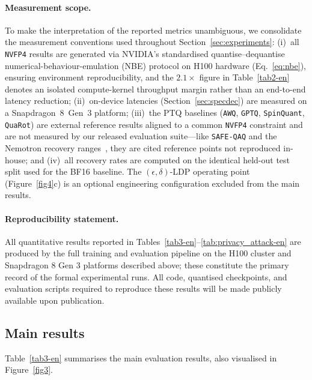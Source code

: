 \documentclass[a4paper,fleqn]{cas-sc}
\begin{document}
\paragraph{Measurement scope.} To make the interpretation of the reported metrics unambiguous, we consolidate the measurement conventions used throughout Section~\ref{sec:experiments}: (i)~all \texttt{NVFP4} results are generated via NVIDIA's standardised quantise--dequantise numerical-behaviour-emulation (NBE) protocol on H100 hardware (Eq.~\eqref{eq:nbe}), ensuring environment reproducibility, and the $2.1\times$ figure in Table~\ref{tab2-en} denotes an isolated compute-kernel throughput margin rather than an end-to-end latency reduction; (ii)~on-device latencies (Section~\ref{sec:specdec}) are measured on a Snapdragon~8~Gen~3 platform; (iii)~the PTQ baselines (\texttt{AWQ}, \texttt{GPTQ}, \texttt{SpinQuant}, \texttt{QuaRot}) are external reference results aligned to a common \texttt{NVFP4} constraint and are not measured by our released evaluation suite---like \texttt{SAFE-QAQ} and the Nemotron recovery ranges~\citep{3}, they are cited reference points not reproduced in-house; and (iv)~all recovery rates are computed on the identical held-out test split used for the BF16 baseline. The $(\epsilon,\delta)$-LDP operating point (Figure~\ref{fig4}c) is an optional engineering configuration excluded from the main results.

\paragraph{Reproducibility statement.} All quantitative results reported in Tables~\ref{tab3-en}--\ref{tab:privacy_attack-en} are produced by the full training and evaluation pipeline on the H100 cluster and Snapdragon 8 Gen 3 platforms described above; these constitute the primary record of the formal experimental runs. All code, quantised checkpoints, and evaluation scripts required to reproduce these results will be made publicly available upon publication.

\subsection{Main results}\label{sec:main-results}

Table~\ref{tab3-en} summarises the main evaluation results, also visualised in Figure~\ref{fig3}.
\end{document}
